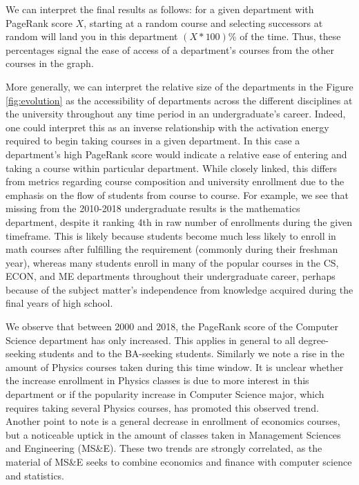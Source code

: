 \documentclass{sigchi}
\begin{document}
We can interpret the final results as follows: for a given department with PageRank score $X$, starting at a random course and selecting successors at random will land you in this department $(X * 100)$\% of the time. Thus, these percentages signal the ease of access of a department's courses from the other courses in the graph.

More generally, we can interpret the relative size of the departments in the Figure \ref{fig:evolution} as the accessibility of departments across the different disciplines at the university throughout any time period in an undergraduate's career. Indeed, one could interpret this as an inverse relationship with the activation energy required to begin taking courses in a given department. In this case a department's high PageRank score would indicate a relative ease of entering and taking a course within particular department. While closely linked, this differs from metrics regarding course composition and university enrollment due to the emphasis on the flow of students from course to course. For example, we see that missing from the 2010-2018 undergraduate results is the mathematics department, despite it ranking 4th in raw number of enrollments during the given timeframe. This is likely because students become much less likely to enroll in math courses after fulfilling the requirement (commonly during their freshman year), whereas many students enroll in many of the popular courses in the CS, ECON, and ME departments throughout their undergraduate career, perhaps because of the subject matter's independence from knowledge acquired during the final years of high school.

We observe that between 2000 and 2018, the PageRank score of the Computer Science department has only increased. This applies in general to all degree-seeking students and to the BA-seeking students. Similarly we note a rise in the amount of Physics courses taken during this time window. It is unclear whether the increase enrollment in Physics classes is due to more interest in this department or if the popularity increase in Computer Science major, which requires taking several Physics courses, has promoted this observed trend. Another point to note is a general decrease in enrollment of economics courses, but a noticeable uptick in the amount of classes taken in Management Sciences and Engineering (MS\&E). These two trends are strongly correlated, as the material of MS\&E seeks to combine economics and finance with computer science and statistics. 
\end{document}
